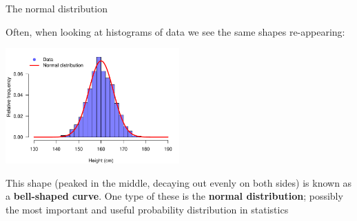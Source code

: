 \documentclass[12pt,xcolor=dvipsnames,handout,mathserif,aspectratio=169]{beamer}
\newcommand{\bbl}[1]{{\color{NavyBlue} \textbf{#1}}}
\newcommand{\bgr}[1]{{\color{PineGreen} \textbf{#1}}}
\begin{document}
\begin{frame}{ The normal distribution }

Often, when looking at histograms of data we see the same shapes re-appearing:
\begin{center}
\includegraphics[width=0.5\textwidth]{WomensHeights.pdf}
\end{center}
\pause
This shape (peaked in the middle, decaying out evenly on both sides) is known as a \bgr{bell-shaped curve}. One type of these is the \bbl{normal distribution}; possibly the most important and useful probability distribution in statistics

\end{frame}
\end{document}
